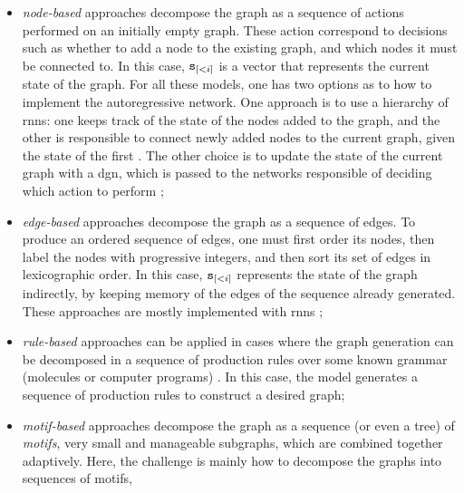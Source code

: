 \begin{itemize}
    \item \emph{node-based} approaches decompose the graph as a sequence of actions performed on an initially empty graph. These action correspond to decisions such as whether to add a node to the existing graph, and which nodes it must be connected to. In this case, $\mathtt{s}_{[<i]}$ is a vector that represents the current state of the graph. For all these models, one has two options as to how to implement the autoregressive network. One approach is to use a hierarchy of \glspl{rnn}: one keeps track of the state of the nodes added to the graph, and the other is responsible to connect newly added nodes to the current graph, given the state of the first \citep{you2018graphrnn}. The other choice is to update the state of the current graph with a \gls{dgn}, which is passed to the networks responsible of deciding which action to perform \citep{li2018learningdeepgmg};
    \item \emph{edge-based} approaches decompose the graph as a sequence of edges. To produce an ordered sequence of edges, one must first order its nodes, then label the nodes with progressive integers, and then sort its set of edges in lexicographic order. In this case, $\mathtt{s}_{[<i]}$ represents the state of the graph indirectly, by keeping memory of the edges of the sequence already generated. These approaches are mostly implemented with \glspl{rnn} \citep{goyal2020graphgen,bacciu2019edgegraphgenrnn};
    \item \emph{rule-based} approaches can be applied in cases where the graph generation can be decomposed in a sequence of production rules over some known grammar (\eg molecules or computer programs) \citep{kusner2017grammarvae,dai2018sdvae}. In this case, the model generates a sequence of production rules to construct a desired graph;
    \item \emph{motif-based} approaches decompose the graph as a sequence (or even a tree) of \emph{motifs}, \ie very small and manageable subgraphs, which are combined together adaptively. Here, the challenge is mainly how to decompose the graphs into sequences of motifs,
\end{itemize}
